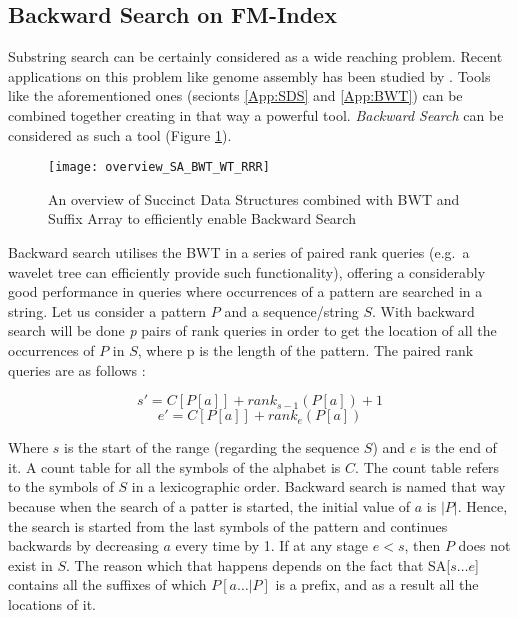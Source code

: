 \subsection{Backward Search on FM-Index}{\label{App:bs_fm}}
Substring search can be certainly considered as a wide reaching problem. Recent applications on this problem like genome assembly has been studied by \citeauthor{3_simpson_durbin_2010} \citeyear{3_simpson_durbin_2010}. Tools like the aforementioned ones (secionts \ref{App:SDS} and \ref{App:BWT}) can be combined together creating in that way a powerful tool. \emph{Backward Search} can be considered as such a tool (Figure \ref{fig:overview_sds_bwt_sa}).

\begin{figure}[h]
    \centering
    \texttt{[image: overview\_SA\_BWT\_WT\_RRR]}
    \caption{An overview of Succinct Data Structures combined with BWT and Suffix Array to efficiently enable Backward Search}
    \label{fig:overview_sds_bwt_sa}
\end{figure}

Backward search utilises the BWT in a series of paired rank queries (e.g.\ a wavelet tree can efficiently provide such functionality), offering a considerably  good performance in queries where occurrences of a pattern are searched in a string. Let us consider a pattern \(P\) and a sequence/string \(S\). With backward search will be done \emph{p} pairs of rank queries in order to get the location of all the occurrences of \(P\) in \(S\), where p is the length of the pattern. The paired rank queries are as follows \cite{Ferragina}:

\[s\prime = C[P[a]] + rank_{s-1}(P[a])+1\]
\[e\prime = C[P[a]] + rank_{e}(P[a])\]

Where \(s\) is the start of the range (regarding the sequence \(S\)) and \(e\) is the end of it. A count table for all the symbols of the alphabet is \(C\). The count table refers to the symbols of \(S\) in a lexicographic order. Backward search is named that way because when the search of a patter is started, the initial value of \(a\) is \(\vert P \vert\). Hence, the search is started from the last symbols of the pattern and continues backwards  by decreasing \(a\) every time by 1.  If at any stage \(e<s\), then \(P\) does not exist in \(S\). The reason which that happens depends on the fact that SA[\(s\ldots e\)] contains all the suffixes of which \(P[a \ldots \vert{P}]\) is a prefix, and as a result all the locations of it.
